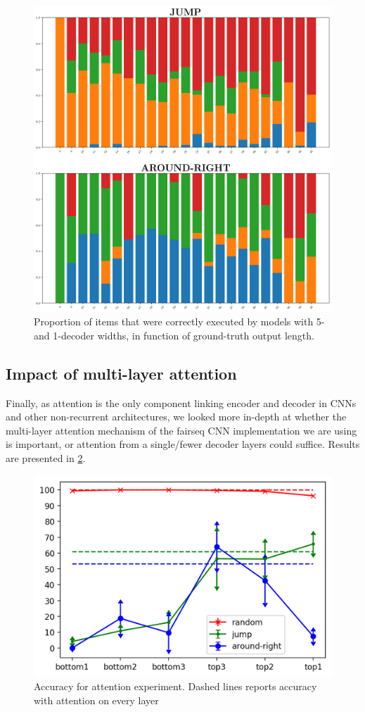 \begin{figure}[tb]
    \centering
    \includegraphics[width=.5\textwidth,keepaspectratio]{figures/split_subset_out.png}
    \caption{Proportion of items that were correctly executed by
      models with 5- and 1-decoder widths, in function of ground-truth
      output length.}
    \label{fig:kernel_width}
\end{figure}

\subsection{Impact of multi-layer attention}
\label{subsec:exp3}

Finally, as attention is the only component linking encoder and
decoder in CNNs and other non-recurrent architectures, we looked more
in-depth at whether the multi-layer attention mechanism of the fairseq 
CNN implementation we are using is important, or attention from a
single/fewer decoder layers could suffice. Results are presented in
\ref{fig:exp3}.

\begin{figure}[tb]
    \centering
    \includegraphics[width=.5\textwidth,keepaspectratio]{figures/attention_exp.png}
    \caption{Accuracy for attention experiment. Dashed lines reports accuracy with attention on every layer}
    \label{fig:exp3}
\end{figure}

